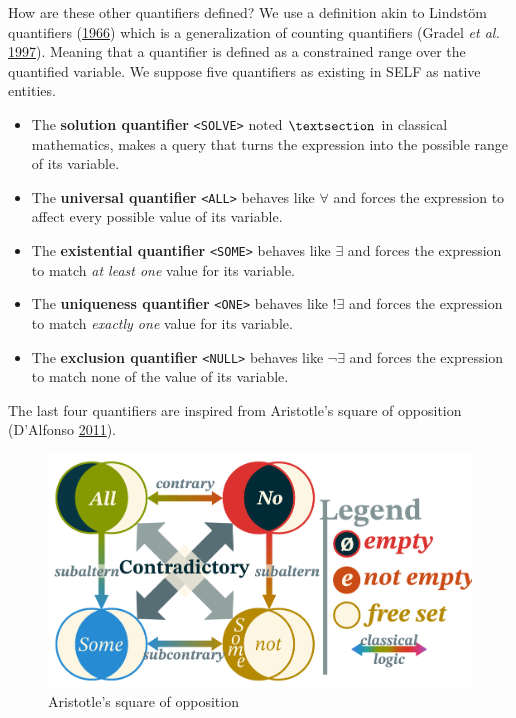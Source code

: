 \documentclass[11pt,a4paper,twoside,openright,titlepage,numbers=noenddot,headinclude,cleardoublepage=empty,openany]{scrreprt}
\theoremstyle{plain}
\theoremstyle{definition}
\theoremstyle{remark}
\newcommand{\passthrough}[1]{#1}
\providecommand{\tightlist}{%
  \setlength{\itemsep}{0pt}\setlength{\parskip}{0pt}}
\begin{document}
How are these other quantifiers defined? We use a definition akin to
Lindstöm quantifiers
(\protect\hyperlink{ref-lindstrom_first_1966}{1966}) which is a
generalization of counting quantifiers (Gradel \emph{et al.}
\protect\hyperlink{ref-gradel_twovariable_1997}{1997}). Meaning that a
quantifier is defined as a constrained range over the quantified
variable. We suppose five quantifiers as existing in SELF as native
entities.

\begin{itemize}
\tightlist
\item
  The \textbf{solution quantifier} \passthrough{\lstinline!<SOLVE>!}
  noted \(\textsection\) in classical mathematics, makes a query that
  turns the expression into the possible range of its variable.
\item
  The \textbf{universal quantifier} \passthrough{\lstinline!<ALL>!}
  behaves like \(\forall\) and forces the expression to affect every
  possible value of its variable.
\item
  The \textbf{existential quantifier} \passthrough{\lstinline!<SOME>!}
  behaves like \(\exists\) and forces the expression to match \emph{at
  least one} value for its variable.
\item
  The \textbf{uniqueness quantifier} \passthrough{\lstinline!<ONE>!}
  behaves like \(!\exists\) and forces the expression to match
  \emph{exactly one} value for its variable.
\item
  The \textbf{exclusion quantifier} \passthrough{\lstinline!<NULL>!}
  behaves like \(\lnot \exists\) and forces the expression to match none
  of the value of its variable.
\end{itemize}

The last four quantifiers are inspired from Aristotle's square of
opposition (D'Alfonso
\protect\hyperlink{ref-dalfonso_generalized_2011}{2011}).

\begin{figure}
\hypertarget{fig:aristotle}{%
\centering
\includegraphics{./tex2pdf.-0b80fea6fd6da7f9/9119427a856b52419237aed8570d8d3105c1e9d1.pdf}
\caption{Aristotle's square of opposition}\label{fig:aristotle}
}
\end{figure}
\end{document}
